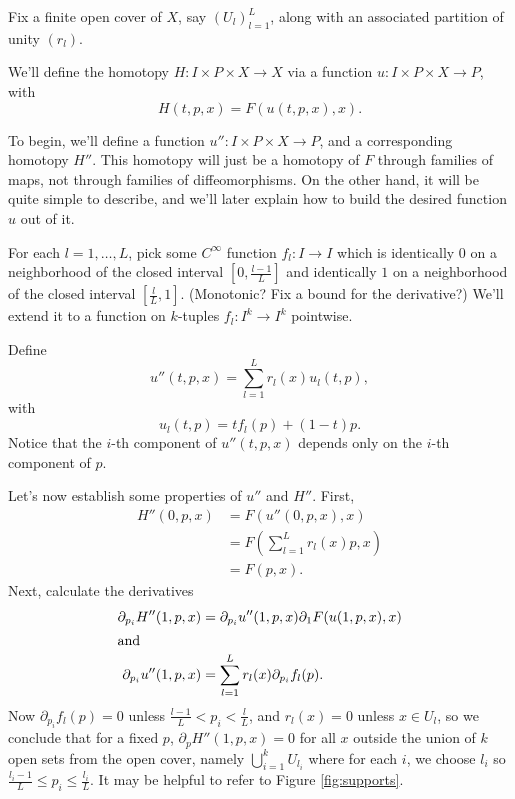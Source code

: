 


Fix a finite open cover of $X$, say $(U_l)_{l=1}^L$, along with an
associated partition of unity $(r_l)$.

We'll define the homotopy $H:I \times P \times X \to X$ via a function
$u:I \times P \times X \to P$, with
\begin{equation*}
H(t,p,x) = F(u(t,p,x),x).
\end{equation*}

To begin, we'll define a function $u'' : I \times P \times X \to P$, and
a corresponding homotopy $H''$. This homotopy will just be a homotopy of
$F$ through families of maps, not through families of diffeomorphisms. On
the other hand, it will be quite simple to describe, and we'll later
explain how to build the desired function $u$ out of it.

For each $l = 1, \ldots, L$, pick some $C^\infty$ function $f_l : I \to
I$ which is identically $0$ on a neighborhood of the closed interval $[0,\frac{l-1}{L}]$
and identically $1$ on a neighborhood of the closed interval $[\frac{l}{L},1]$. (Monotonic?
Fix a bound for the derivative?) We'll extend it to a function on
$k$-tuples $f_l : I^k \to I^k$ pointwise.

Define $$u''(t,p,x) = \sum_{l=1}^L r_l(x) u_l(t,p),$$ with
$$u_l(t,p) = t f_l(p) + (1-t)p.$$ Notice that the $i$-th component of $u''(t,p,x)$ depends only on the $i$-th component of $p$.

Let's now establish some properties of $u''$ and $H''$. First,
\begin{align*}
H''(0,p,x) & = F(u''(0,p,x),x) \\
           & = F(\sum_{l=1}^L r_l(x) p, x) \\
           & = F(p,x).
\end{align*}
Next, calculate the derivatives
\begin{align*}
\partial_{p_i} H''(1,p,x) & = \partial_{p_i}u''(1,p,x) \partial_1 F(u(1,p,x),x) \\
\intertext{and}
\partial_{p_i}u''(1,p,x) & = \sum_{l=1}^L r_l(x) \partial_{p_i} f_l(p).
\end{align*}
Now $\partial_{p_i} f_l(p) = 0$ unless $\frac{l-1}{L} < p_i < \frac{l}{L}$, and $r_l(x) = 0$ unless $x \in U_l$,
so we conclude that for a fixed $p$, $\partial_p H''(1,p,x) = 0$ for all $x$ outside the union of $k$ open sets from the open cover, namely
$\bigcup_{i=1}^k U_{l_i}$ where for each $i$, we choose $l_i$ so $\frac{l_i -1}{L} \leq p_i \leq \frac{l_i}{L}$. It may be helpful to refer to Figure \ref{fig:supports}.


